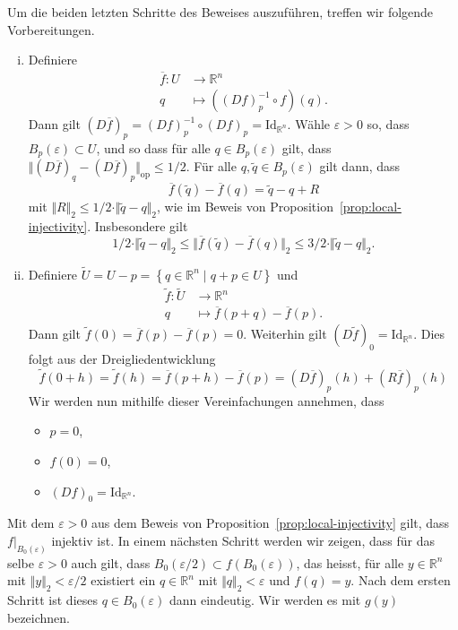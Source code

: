\documentclass[../main.tex]{subfiles}
\begin{document}
Um die beiden letzten Schritte des Beweises auszuführen,
treffen wir folgende Vorbereitungen.
\begin{enumerate}[(i)]
  \item Definiere
    \begin{align*}
      \overline f \colon U & \to \mathbb{R}^n \\
      q & \mapsto ({(Df)}_p^{-1} \circ f)(q).
    \end{align*}
    Dann gilt ${(D \overline f)}_p = {(Df)}_p^{-1} \circ {(Df)}_p
    = \text{Id}_{\mathbb{R}^n}$.
    Wähle $\varepsilon > 0$ so, dass $B_p(\varepsilon) \subset U$,
    und so dass für alle $q \in B_p(\varepsilon)$ gilt, dass
    \(
      \Vert {(D \overline f)}_q - {(D \overline f)}_p \Vert_{\text{op}}
        \leq 1/2
    \).
    Für alle $q, \widetilde q \in B_p(\varepsilon)$ gilt dann, dass
    \[
      \overline f ( \widetilde q ) - \overline f (q) = \widetilde q - q + R
    \]
    mit $\Vert R \Vert_2 \leq 1/2 \cdot \Vert \widetilde q - q \Vert_2$,
    wie im Beweis von Proposition~\ref{prop:local-injectivity}.
    Insbesondere gilt
    \[
      1/2 \cdot \Vert \widetilde q - q \Vert_2 \leq
      \Vert \overline f ( \widetilde q ) - \overline f (q) \Vert_2
      \leq 3/2 \cdot \Vert \widetilde q - q \Vert_2.
    \]
  \item Definiere $\widetilde U = U - p
    = \left\{q \in \mathbb{R}^n \mid q + p \in U\right\}$
    und
    \begin{align*}
      \widetilde f \colon \widetilde U & \to \mathbb{R}^n \\
      q & \mapsto \overline f(p + q) - \overline f(p).
    \end{align*}
    Dann gilt $\widetilde f ( 0 ) = \overline f(p) - \overline f (p) = 0$.
    Weiterhin gilt ${(D\widetilde f )}_0 = \text{Id}_{\mathbb{R}^n}$.
    Dies folgt aus der Dreigliedentwicklung
    \[
      \widetilde f ( 0 + h ) = \widetilde f (h)
      = \overline f ( p + h ) - \overline f ( p )
      = {(D \overline f )}_p(h) + {(R \overline f)}_p (h)
    \]
    Wir werden nun mithilfe dieser Vereinfachungen annehmen,
    dass
    \begin{itemize}
      \item $p = 0$,
      \item $f(0) = 0$,
      \item ${(Df)}_0 = \text{Id}_{\mathbb{R}^n}$.
    \end{itemize}
\end{enumerate}

Mit dem $\varepsilon > 0$ aus dem Beweis von
Proposition~\ref{prop:local-injectivity} gilt,
dass
$f |_{B_0(\varepsilon)}$ injektiv ist.
In einem nächsten Schritt werden wir zeigen,
dass für das selbe $\varepsilon > 0$ auch gilt,
dass $B_0(\varepsilon/2) \subset f(B_0(\varepsilon))$,
das heisst, für alle $y \in \mathbb{R}^n$
mit $\Vert y \Vert_2 < \varepsilon/2$ existiert
ein $q \in \mathbb{R}^n$ mit $\Vert q \Vert_2 < \varepsilon$
und $f(q) = y$.
Nach dem ersten Schritt ist dieses $q \in B_0(\varepsilon)$
dann eindeutig. Wir werden es mit $g(y)$ bezeichnen.
\end{document}

